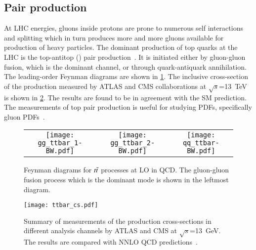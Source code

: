 \subsection*{Pair production}
At LHC energies, gluons inside protons are prone to numerous self interactions and splitting which in 
turn produces more and more gluons available for production of heavy particles. 
The dominant production of top quarks at the LHC is the top-antitop (\ttbar) pair production~\cite{TOPQ-2015-09}. It is
initiated either by gluon-gluon fusion, which is the dominant channel, or through quark-antiquark annihilation.
The leading-order Feynman diagrams are shown in \cref{fig:ttbarprod}. The inclusive cross-section
of the \ttbar production measured by ATLAS and CMS collaborations at $\sqrt{s}$=\qty{13}{\TeV} is
shown in \cref{fig:ttbar_cs}. The results are found to be in agreement with the SM prediction.
The measurements of top pair production is useful for studying PDFs, specifically 
gluon PDFs~\cite{FABBRI201763}.

\begin{figure}[htbp]
    \centering
    \begin{tabular}{ccc}
        \texttt{[image: gg\_ttbar\_1-BW.pdf]} &
        \texttt{[image: gg\_ttbar\_2-BW.pdf]} &
        \texttt{[image: qq\_ttbar-BW.pdf]} \\[1ex]
    \end{tabular}
    \caption[Feynman diagrams for $t\Bar{t}$ processes at LO in QCD]{Feynman diagrams for $t\Bar{t}$ processes at LO in QCD. The gluon-gluon fusion
    process which is the dominant mode is shown in the leftmost diagram. }
    \label{fig:ttbarprod}
\end{figure}

\begin{figure}[htbp]
    \centering
    \texttt{[image: ttbar\_cs.pdf]}
    \caption[Cross-section of the \ttbar process]{Summary of measurements of the \ttbar production
    cross-sections in different analysis channels by ATLAS and CMS at $\sqrt{s}$=\qty{13}{\GeV}. The 
    results are compared with NNLO QCD predictions~\cite{ATL-PHYS-PUB-2024-006}.}%
    \label{fig:ttbar_cs}
\end{figure}

